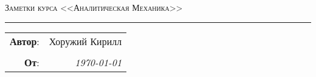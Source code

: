 
\begin{center}
    \LARGE \textsc{Заметки курса <<Аналитическая Механика>>}
\end{center}

\hrule

\phantom{42}

\begin{flushright}
    \begin{tabular}{rr}
        \textbf{Автор}: 
        & Хоружий Кирилл \\
        &\\
        \textbf{От}: &
        \textit{\today}\\
    \end{tabular}
\end{flushright}

\thispagestyle{empty}
\tableofcontents
\newpage